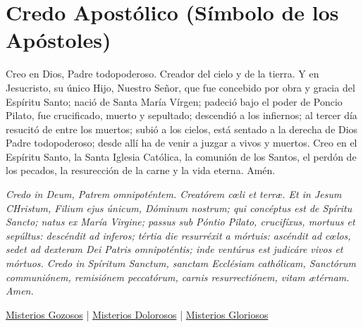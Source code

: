 \documentclass[a4paper,11pt, oneside]{report}
\begin{document}
\section*{Credo Apostólico (Símbolo de los Apóstoles)}
  {
    Creo en Dios, Padre todopoderoso. Creador del cielo y de la tierra. Y en Jesucristo, su único Hijo, Nuestro Señor, que fue concebido por
    obra y gracia del Espíritu Santo; nació de Santa María Vírgen; padeció bajo el poder de Poncio Pilato, fue crucificado, muerto y sepultado;
    descendió a los infiernos; al tercer día resucitó de entre los muertos; subió a los cielos, está sentado a la derecha de Dios Padre todopoderoso;
    desde allí ha de venir a juzgar a vivos y muertos. Creo en el Espíritu Santo, la Santa Iglesia Católica, la comunión de los Santos, el perdón
    de los pecados, la resurección de la carne y la vida eterna. Amén.

    \medskip

    \textit{Credo in Deum, Patrem omnipoténtem. Creatórem c{\oe}li et terr{\ae}. Et in Jesum CHristum, Filium ejus únicum, Dóminum nostrum; qui concéptus
    est de Spíritu Sancto; natus ex María Virgine; passus sub Póntio Pilato, crucifíxus, mortuus et sepúltus: descéndit ad inferos; tértia die resurréxit
    a mórtuis: ascéndit ad c{\oe}los, sedet ad dexteram Dei Patris omnipoténtis; inde ventúrus est judicáre vivos et mórtuos. Credo in Spíritum Sanctum,
    sanctam Ecclésiam cathólicam, Sanctórum communiónem, remisiónem peccatórum, carnis resurrectiónem, vitam {\ae}térnam. Amen.}
  }

  \bigskip
  
  {
  \begin{center}
    \hyperlink{sec:gozosos}{Misterios Gozosos} | \hyperlink{sec:dolorosos}{Misterios Dolorosos} | \hyperlink{sec:gloriosos}{Misterios Gloriosos}
  \end{center}
    
  }
\end{document}
